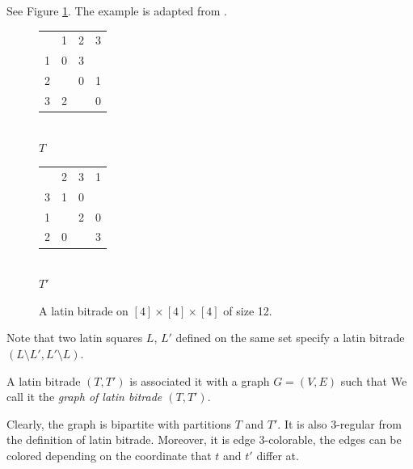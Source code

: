 \begin{exmp}
See Figure \ref{fig:latin-bitrade}. The example is adapted from \cite{Cavenagh08}.

\begin{figure}[htb]
	\centering
	\begin{minipage}{.30\linewidth}
		\begin{center}
		\begin{tabular}{| c c c c |}
			\hline
  & 1 & 2 & 3 \\
1 & 0 & 3 &   \\
2 &   & 0 & 1 \\
3 & 2 &   & 0 \\
			\hline
		\end{tabular} \\
		\bigskip
		$T$
		\end{center}
	\end{minipage}
	\begin{minipage}{.30\linewidth}
		\begin{center}
		\begin{tabular}{| c c c c |}
			\hline
  & 2 & 3 & 1 \\
3 & 1 & 0 &   \\
1 &   & 2 & 0 \\
2 & 0 &   & 3 \\
			\hline
		\end{tabular} \\
		\bigskip
		$T'$
		\end{center}
	\end{minipage}
	\caption{A latin bitrade on $[4] \times [4] \times [4]$ of size 12.}
	\label{fig:latin-bitrade}
\end{figure}

\end{exmp}%

Note that two latin squares $L$, $L'$ defined on the same set specify a latin bitrade $(L \setminus L', L' \setminus L)$.

\begin{defn}
A latin bitrade $(T, T')$ is associated it with a graph $G = (V, E)$ such that
We call it the \emph{graph of latin bitrade $(T, T')$}.
\end{defn}

Clearly, the graph is bipartite with partitions $T$ and $T'$. It is also 3-regular from the definition of latin bitrade. Moreover, it is edge 3-colorable, the edges can be colored depending on the coordinate that $t$ and $t'$ differ at.

